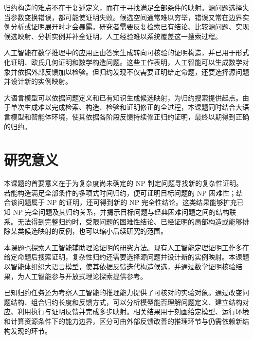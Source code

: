 归约构造的难点不在于复述定义，而在于寻找满足全部条件的映射。源问题选择失当参数变换错误，都可能使证明失败。候选空间通常难以穷举，错误又常在边界实例分析或证明展开时才会暴露。研究者需要反复检索已有结论、比较源问题、实现候选映射、分析实例并补全证明，人工经验难以系统覆盖这一搜索过程。

人工智能在数学推理中的应用正由答案生成转向可核验的证明构造，并已用于形式化证明、欧氏几何证明和数学构造问题\citep{zheng2022minif2f,yang2023leandojo,trinh2024alphageometry,romeraparedes2024funsearch,hubert2026alphaproof}。这些工作表明，人工智能可以生成数学对象并依据外部反馈加以检验。但归约发现不仅需要证明给定命题，还要选择源问题并设计新的实例映射。

大语言模型可以依据问题定义和已有知识生成候选映射，为归约搜索提供起点。由于单次生成难以完成检索、构造、检验和证明修正的全过程，本课题同时结合大语言模型和智能体环境，使其依据各阶段反馈持续修正归约证明，最终以期得到正确的归约。

\section{研究意义}

本课题的首要意义在于为复杂度尚未确定的 NP 判定问题寻找新的复杂性证明。若能构造满足全部条件的多项式时间归约，便可证明目标问题的 NP 困难性；结合该问题属于 NP 的证明，还可得到新的 NP 完全性结论。这类结果能够扩充已知 NP 完全问题及其归约关系，并揭示目标问题与经典困难问题之间的结构联系。无法得到完整归约时，受限问题的困难性结论、已经证明的局部构造或能够排除某类候选映射的反例，也可以缩小后续研究的范围。

本课题也探索人工智能辅助理论证明的研究方法。现有人工智能定理证明工作多在给定命题后搜索证明\citep{lample2022hypertree,jiang2023draft,xin2024deepseekprover}，复杂性归约还需要选择源问题并设计新的实例映射。本课题以智能体组织大语言模型，使其依据反馈迭代构造候选，并通过数学证明核验结果，为人工智能参与开放式理论探索提供参考。

已知归约任务还为考察人工智能的推理能力提供了可核对的实验对象。通过改变问题结构、组合归约长度和反馈方式，可以分析模型能否理解问题定义、建立结构对应、利用执行与证明反馈并完成多步映射。相关结果用于刻画给定模型、运行环境和计算资源条件下的能力边界，区分可由外部反馈改善的推理环节与仍需依赖新结构发现的环节。
